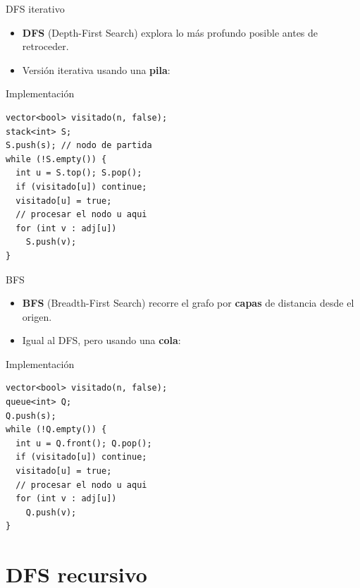 \documentclass[aspectratio=169]{beamer}
\begin{document}
\begin{frame}[fragile]{DFS iterativo}
  \begin{itemize}
    \item \textbf{DFS} (Depth-First Search) explora lo más profundo posible antes de retroceder.
    \item Versión iterativa usando una \textbf{pila}:
  \end{itemize}
  \begin{block}{Implementación}
  \begin{lstlisting}[style=customc]
vector<bool> visitado(n, false);
stack<int> S;
S.push(s); // nodo de partida
while (!S.empty()) {
  int u = S.top(); S.pop();
  if (visitado[u]) continue;
  visitado[u] = true;
  // procesar el nodo u aqui
  for (int v : adj[u])
    S.push(v);
}\end{lstlisting}
  \end{block}
\end{frame}

\begin{frame}[fragile]{BFS}
  \begin{itemize}
    \item \textbf{BFS} (Breadth-First Search) recorre el grafo por \textbf{capas} de distancia desde el origen.
    \item Igual al DFS, pero usando una \textbf{cola}:
  \end{itemize}
  \begin{block}{Implementación}
  \begin{lstlisting}[style=customc]
vector<bool> visitado(n, false);
queue<int> Q;
Q.push(s);
while (!Q.empty()) {
  int u = Q.front(); Q.pop();
  if (visitado[u]) continue;
  visitado[u] = true;
  // procesar el nodo u aqui
  for (int v : adj[u])
    Q.push(v);
}\end{lstlisting}
  \end{block}
\end{frame}

\section{DFS recursivo}
\end{document}
